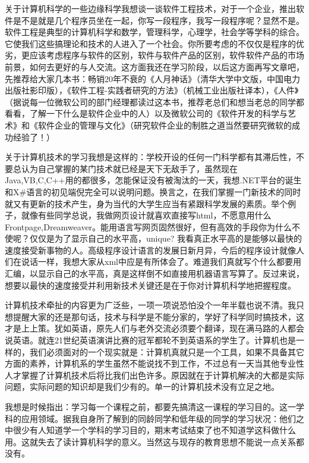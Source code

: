 关于计算机科学的一些边缘科学我想谈一谈软件工程技术，对于一个企业，推出软件是不是就是几个程序员坐在一起，你写一段程序，我写一段程序呢？显然不是。软件工程是典型的计算机科学和数学，管理科学，心理学，社会学等学科的综合。它使我们这些搞理论和技术的人进入了一个社会。你所要考虑的不仅仅是程序的优劣，更应该考虑程序与软件的区别，软件与软件产品的区别，软件软件产品的市场前景，如何去更好的与人交流。这方面我还在学习阶段，以后这方面再写文章吧，先推荐给大家几本书：畅销20年不衰的《人月神话》（清华大学中文版，中国电力出版社影印版），《软件工程-实践者研究的方法》（机械工业出版社译本），《人件》（据说每一位微软公司的部门经理都读过这本书，推荐老总们和想当老总的同学都看看，了解一下什么是软件企业中的人）以及微软公司的《软件开发的科学与艺术》和《软件企业的管理与文化》（研究软件企业的制胜之道当然要研究微软的成功经验了！）


关于计算机技术的学习我想是这样的：学校开设的任何一门科学都有其滞后性，不要总认为自己掌握的某门技术就已经是天下无敌手了，虽然现在Java,VB,C,C++用的都很多，怎能保证没有被淘汰的一天，我想.NET平台的诞生和X\#语言的初见端倪完全可以说明问题。换言之，在我们掌握一门新技术的同时就又有更新的技术产生，身为当代的大学生应当有紧跟科学发展的素质。举个例子，就像有些同学总说，我做网页设计就喜欢直接写html，不愿意用什么Frontpage,Dreamweaver。能用语言写网页固然很好，但有高效的手段你为什么不使呢？仅仅是为了显示自己的水平高，unique? 我看真正水平高的是能够以最快的速度接受新事物的人。高级程序设计语言的发展日新月异，今后的程序设计就像人们在说话一样，我想大家从xml中应是有所体会了。难道我们真就写个什么都要用汇编，以显示自己的水平高，真是这样倒不如直接用机器语言写算了。反过来说，想要以最快的速度接受并利用新技术关键还是在于你对计算机科学地把握程度。


计算机技术牵扯的内容更为广泛些，一项一项说恐怕没个一年半载也说不清。我只想提醒大家的还是那句话，技术与科学是不能分家的，学好了科学同时搞技术，这才是上上策。犹如英语，原先人们与老外交流必须要个翻译，现在满马路的人都会说英语。就连21世纪英语演讲比赛的冠军都轮不到英语系的学生了。计算机也是一样的，我们必须面对的一个现实就是：计算机真就只是一个工具，如果不具备其它方面的素养，计算机系的学生虽然不能说找不到工作，不过总有一天当其他专业性人才掌握了计算机技术后将比我们出色许多。原因就在于计算机解决的大都是实际问题，实际问题的知识却是我们少有的。单一的计算机技术没有立足之地。


我想是时候指出：学习每一个课程之前，都要先搞清这一课程的学习目的。这一学科的应用领域。据我自身所了解到的同龄同学和低年级的同学的学习状况：他们之中很少有人知道学一个学科的学习目的，期末考试结束了也不知道学这科做什么用。这就失去了读计算机科学的意义。当然这与现存的教育思想不能说一点关系都没有。


